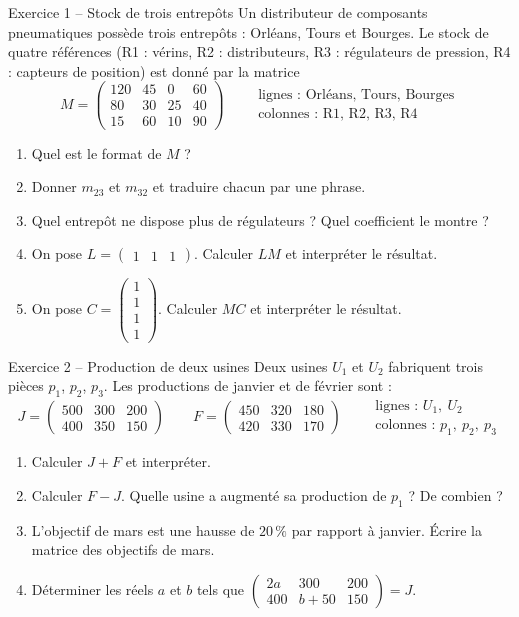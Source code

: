 \documentclass[a4paper,11pt]{article}
\newcommand{\M}[1]{\begin{pmatrix}#1\end{pmatrix}}
\begin{document}
\begin{exo}{Exercice 1 -- Stock de trois entrepôts}
\label{exo:1}
Un distributeur de composants pneumatiques possède trois entrepôts : Orléans, Tours et Bourges. Le stock de quatre références (R1 : vérins, R2 : distributeurs, R3 : régulateurs de pression, R4 : capteurs de position) est donné par la matrice
\[
M = \M{120 & 45 & 0 & 60\\ 80 & 30 & 25 & 40\\ 15 & 60 & 10 & 90}
\qquad
\begin{array}{l}\text{lignes : Orléans, Tours, Bourges}\\ \text{colonnes : R1, R2, R3, R4}\end{array}
\]
\begin{enumerate}[label=\alph*)]
  \item Quel est le format de $M$ ?
  \item Donner $m_{23}$ et $m_{32}$ et traduire chacun par une phrase.
  \item Quel entrepôt ne dispose plus de régulateurs ? Quel coefficient le montre ?
  \item On pose $L = \M{1 & 1 & 1}$. Calculer $LM$ et interpréter le résultat.
  \item On pose $C = \M{1\\1\\1\\1}$. Calculer $MC$ et interpréter le résultat.
\end{enumerate}
\end{exo}

\begin{exo}{Exercice 2 -- Production de deux usines}
\label{exo:2}
Deux usines $U_1$ et $U_2$ fabriquent trois pièces $p_1$, $p_2$, $p_3$. Les productions de janvier et de février sont :
\[
J = \M{500 & 300 & 200\\ 400 & 350 & 150}
\qquad
F = \M{450 & 320 & 180\\ 420 & 330 & 170}
\qquad
\begin{array}{l}\text{lignes : } U_1,\ U_2\\ \text{colonnes : } p_1,\ p_2,\ p_3\end{array}
\]
\begin{enumerate}[label=\alph*)]
  \item Calculer $J+F$ et interpréter.
  \item Calculer $F-J$. Quelle usine a augmenté sa production de $p_1$ ? De combien ?
  \item L'objectif de mars est une hausse de $20\,\%$ par rapport à janvier. Écrire la matrice des objectifs de mars.
  \item Déterminer les réels $a$ et $b$ tels que $\M{2a & 300 & 200\\ 400 & b+50 & 150} = J$.
\end{enumerate}
\end{exo}
\end{document}
